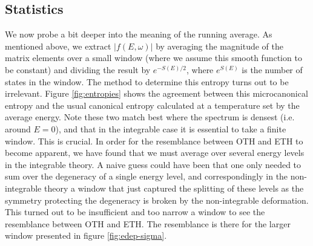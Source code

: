 \subsection{Statistics}
We now probe a bit deeper into the meaning of the running average. As mentioned above, we extract $|f(E,\omega)|$ by averaging the magnitude of the matrix elements over a small window (where we assume this smooth function to be constant) and dividing the result by $e^{-S(E)/2}$, where $e^{S(E)}$ is the number of states in the window. The method to determine this entropy turns out to be irrelevant. Figure \ref{fig:entropies} shows the agreement between this microcanonical entropy and the usual canonical entropy calculated at a temperature set by the average energy. Note these two match best where the spectrum is densest (i.e. around $E=0$), and that in the integrable case it is essential to take a finite window. This is crucial. In order for the resemblance between OTH and ETH to become apparent, we have found that we must average over several energy levels in the integrable theory. A naive guess could have been that one only needed to sum over the degeneracy of a single energy level, and correspondingly in the non-integrable theory a window that just captured the splitting of these levels as the symmetry protecting the degeneracy is broken by the non-integrable deformation. This turned out to be insufficient and too narrow a window to see the resemblance between OTH and ETH. The resemblance is there for the larger window presented in figure \ref{fig:edep-sigma}.

